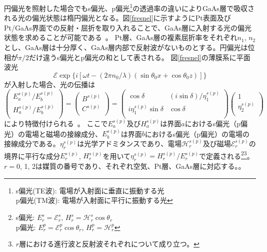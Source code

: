 円偏光を照射した場合でもs偏光、p偏光\footnote{s偏光(TE波): 電場が入射面に垂直に振動する光\\p偏光(TM波): 電場が入射面に平行に振動する光}の透過率の違いによりGaAs層で吸収される光の偏光状態は楕円偏光となる。図\ref{fresnel}に示すようにPt表面及びPt/GaAs界面での反射・屈折を取り入れることで、GaAs層に入射する光の偏光状態を求めることが可能である~\cite{Macleod,Born}。
Pt層、GaAs層の複素屈折率をそれぞれ$n_1$, $n_2$とし、GaAs層は十分厚く、GaAs層内部で反射波がないものとする。円偏光は位相が$\pi/2$だけ違うs偏光とp偏光の和として表される。
図\ref{fresnel}の薄膜系に平面波光
\begin{equation}
{\mathscr{E}} \exp\{i[\omega t-(2\pi n_0/\lambda)(\sin\theta_0 x+\cos\theta_0 z)]\}\label{erer}
\end{equation}
が入射した場合、光の伝播は
\begin{equation}
\left( {\begin{array}{*{20}{c}}
   {{E_a^{s(p)}}/{E_b^{s(p)}}}  \\
   {{H_a^{s(p)}}/{E_b^{s(p)}}}  \\
\end{array}} \right) = \left( {\begin{array}{*{20}{c}}
   B^{s(p)}  \\
   C^{s(p)}  \\
\end{array}} \right) = \left( {\begin{array}{*{20}{c}}
   {\cos \delta } & {(i\sin \delta )/{\eta _1^{s(p)}}}  \\
   {i{\eta _1^{s(p)}}\sin \delta } & {\cos \delta }  \\
\end{array}} \right)\left( {\begin{array}{*{20}{c}}
   1  \\
   {{\eta _2^{s(p)}}}  \\
\end{array}} \right)\label{tokusei}
\end{equation}
により特徴付けられる~\cite{Macleod}。
ここで$E_a^{s(p)}$及び$H_a^{s(p)}$は界面$a$におけるs偏光（p偏光）の電場と磁場の接線成分、$E_b^{s(p)}$は界面$b$におけるs偏光（p偏光）の電場の接線成分である。$\eta_r^{s(p)}$は光学アドミタンスであり、電場$\mathscr{H}_r^{s(p)}$及び磁場$\mathscr{E}_r^{s(p)}$の境界に平行な成分$E_r^{s(p)}$, $H_r^{s(p)}$を用いて$\eta_r^{s(p)}=H_r^{s(p)}/E_r^{s(p)}$で定義される\footnote{s偏光: $E_r^s=\mathscr{E}_r^s$, $H_r^s=\mathscr{H}_r^s\cos\theta_r$
\\p偏光: $E_r^p=\mathscr{E}_r^p\cos\theta_r$, $H_r^p=\mathscr{H}_r^p$}\footnote{$r$層における進行波と反射波それぞれについて成り立つ。}。$r=0$, 1, 2は媒質の番号であり、それぞれ空気、Pt層、GaAs層に対応する。。
